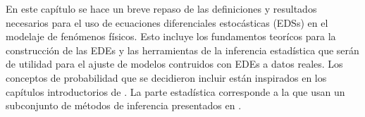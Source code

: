 En este capítulo se hace un breve repaso de las definiciones
y resultados necesarios para el uso de ecuaciones diferenciales 
estocásticas (EDSs) en el modelaje de fenómenos físicos. Esto 
incluye los fundamentos teorícos para la construcción de las EDEs 
y las herramientas de la inferencia estadística que serán de 
utilidad para el ajuste de modelos contruidos con EDEs a datos 
reales. Los conceptos de probabilidad que se decidieron incluir 
están inspirados en los capítulos introductorios de 
\textcite{
arnoldStochasticDifferentialEquations1974,
oksendalStochasticDifferentialEquations2003,
maoStochasticDifferentialEquations2011,
rinconIntroduccionProcesosEstocasticos2012, 
dobrowIntroductionStochasticProcesses2016}. 
La parte estadística corresponde a la que usan un subconjunto
de métodos de inferencia presentados en 
\textcite{
iacusSimulationInferenceStochastic2008, 
fuchsInferenceDiffusionProcesses2013}.




